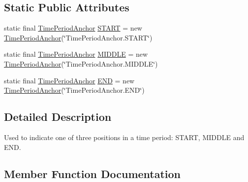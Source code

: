 \subsection*{Static Public Attributes}
\begin{DoxyCompactItemize}
\item 
static final \mbox{\hyperlink{classorg_1_1jfree_1_1data_1_1time_1_1_time_period_anchor}{Time\+Period\+Anchor}} \mbox{\hyperlink{classorg_1_1jfree_1_1data_1_1time_1_1_time_period_anchor_a0fcc9cde289277369319eb093592fcf7}{S\+T\+A\+RT}} = new \mbox{\hyperlink{classorg_1_1jfree_1_1data_1_1time_1_1_time_period_anchor}{Time\+Period\+Anchor}}(\char`\"{}Time\+Period\+Anchor.\+S\+T\+A\+RT\char`\"{})
\item 
static final \mbox{\hyperlink{classorg_1_1jfree_1_1data_1_1time_1_1_time_period_anchor}{Time\+Period\+Anchor}} \mbox{\hyperlink{classorg_1_1jfree_1_1data_1_1time_1_1_time_period_anchor_ae6b2bf8530ce0773f48dea83a2594414}{M\+I\+D\+D\+LE}} = new \mbox{\hyperlink{classorg_1_1jfree_1_1data_1_1time_1_1_time_period_anchor}{Time\+Period\+Anchor}}(\char`\"{}Time\+Period\+Anchor.\+M\+I\+D\+D\+LE\char`\"{})
\item 
static final \mbox{\hyperlink{classorg_1_1jfree_1_1data_1_1time_1_1_time_period_anchor}{Time\+Period\+Anchor}} \mbox{\hyperlink{classorg_1_1jfree_1_1data_1_1time_1_1_time_period_anchor_a43bf0cd400abe55bfb07345a9f95a321}{E\+ND}} = new \mbox{\hyperlink{classorg_1_1jfree_1_1data_1_1time_1_1_time_period_anchor}{Time\+Period\+Anchor}}(\char`\"{}Time\+Period\+Anchor.\+E\+ND\char`\"{})
\end{DoxyCompactItemize}


\subsection{Detailed Description}
Used to indicate one of three positions in a time period\+: {\ttfamily S\+T\+A\+RT}, {\ttfamily M\+I\+D\+D\+LE} and {\ttfamily E\+ND}. 

\subsection{Member Function Documentation}
\mbox{\label{classorg_1_1jfree_1_1data_1_1time_1_1_time_period_anchor_a64e5702054da8e2e0172e7807e56923a}} 
